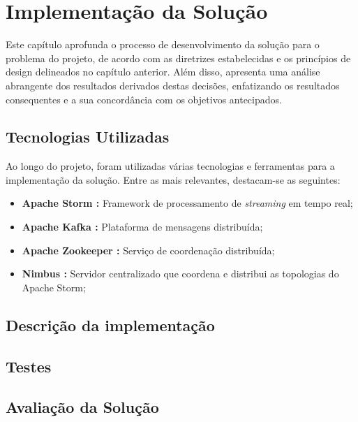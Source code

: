 \chapter{Implementação da Solução}
\label{sec:4-Implementacao}

Este capítulo aprofunda o processo de desenvolvimento da solução para o problema do
projeto, de acordo com as diretrizes estabelecidas e os princípios de design delineados no
capítulo anterior. Além disso, apresenta uma análise abrangente dos resultados derivados destas 
decisões, enfatizando os resultados consequentes e a sua concordância com os objetivos antecipados.

\section{Tecnologias Utilizadas}

Ao longo do projeto, foram utilizadas várias tecnologias e ferramentas para a implementação da solução.
Entre as mais relevantes, destacam-se as seguintes:

\begin{itemize}
  \item \textbf{Apache Storm \cite{storm}:} Framework de processamento de \textit{streaming} em tempo real;
  \item \textbf{Apache Kafka \cite{kafka}:} Plataforma de mensagens distribuída;
  \item \textbf{Apache Zookeeper \cite{zookeeper}:} Serviço de coordenação distribuída;
  \item \textbf{Nimbus \cite{nimbus}:} Servidor centralizado que coordena e distribui as topologias 
    do Apache Storm;
\end{itemize}

\section{Descrição da implementação}


\section{Testes}


\section{Avaliação da Solução}

